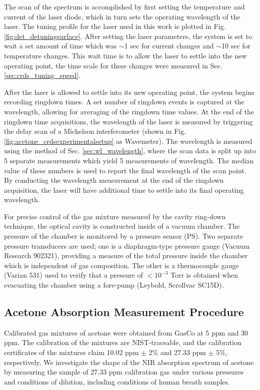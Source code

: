 \documentclass[12pt]{report}
\begin{document}
	The scan of the spectrum is accomplished by first setting the temperature and current of the laser diode, which in turn sets the operating wavelength of the laser. The tuning profile for the laser used in this work is plotted in Fig. \ref{fig:det_detuningsurface}. After setting the laser parameters, the system is set to wait a set amount of time which was $\sim$1 sec for current changes and $\sim$10 sec for temperature changes. This wait time is to allow the laser to settle into the new operating point, the time scale for these changes were measured in Sec. \ref{sec:crds_tuning_speed}.
	
	After the laser is allowed to settle into its new operating point, the system begins recording ringdown times. A set number of ringdown events is captured at the wavelength, allowing for averaging of the ringdown time values. At the end of the ringdown time acquisitions, the wavelength of the laser is measured by triggering the delay scan of a Michelson interferometer (shown in Fig. \ref{fig:acetone_crdsexperimentalsetup} as Wavemeter). The wavelength is measured using the method of Sec. \ref{sec:wl_wavelength}, where the scan data is split up into 5 separate measurements which yield 5 measurements of wavelength. The median value of these numbers is used to report the final wavelength of the scan point. By conducting the wavelength measurement at the end of the ringdown acquisition, the laser will have additional time to settle into its final operating wavelength.
	
	For precise control of the gas mixture measured by the cavity ring-down technique, the optical cavity is constructed inside of a vacuum chamber. The pressure of the chamber is monitored by a pressure sensor (PS). Two separate pressure transducers are used; one is a diaphragm-type pressure gauge (Vacuum Research 902321), providing a measure of the total pressure inside the chamber which is independent of gas composition. The other is a thermocouple gauge (Varian 531) used to verify that a pressure of $<10^{-3}$ Torr is obtained when evacuating the chamber using a fore-pump (Leybold, Scrollvac SC15D).
	
	\subsection{Acetone Absorption Measurement Procedure}
	Calibrated gas mixtures of acetone were obtained from GasCo at 5 ppm and 30 ppm. The calibration of the mixtures are NIST-traceable, and the calibration certificates of the mixtures claim 10.02 ppm $\pm$ 2\% and 27.33 ppm $\pm$ 5\%, respectively. We investigate the shape of the NIR absorption spectrum of acetone by measuring the sample of 27.33 ppm calibration gas under various pressures and conditions of dilution, including conditions of human breath samples. 
	
\end{document}
